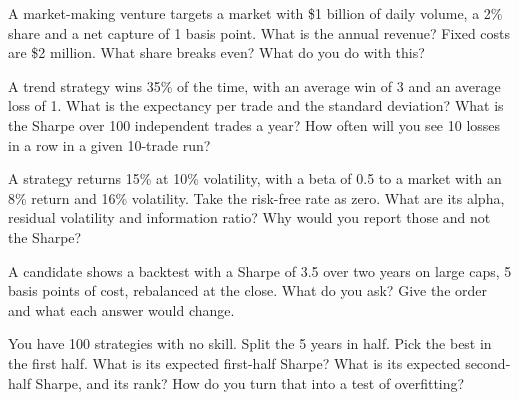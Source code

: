 \begin{question}\label{iq:iv2:research-and-strategy-cases:23}
A market-making venture targets a market with \$1 billion of daily volume, a 2\% share and a net capture of 1 basis point. What is the annual revenue? Fixed costs are \$2 million. What share breaks even? What do you do with this?
\end{question}

\begin{question}\label{iq:iv2:research-and-strategy-cases:24}
A trend strategy wins 35\% of the time, with an average win of 3 and an average loss of 1. What is the expectancy per trade and the standard deviation? What is the Sharpe over 100 independent trades a year? How often will you see 10 losses in a row in a given 10-trade run?
\end{question}

\begin{question}\label{iq:iv2:research-and-strategy-cases:25}
A strategy returns 15\% at 10\% volatility, with a beta of 0.5 to a market with an 8\% return and 16\% volatility. Take the risk-free rate as zero. What are its alpha, residual volatility and information ratio? Why would you report those and not the Sharpe?
\end{question}

\begin{question}\label{iq:iv2:research-and-strategy-cases:26}
A candidate shows a backtest with a Sharpe of 3.5 over two years on large caps, 5 basis points of cost, rebalanced at the close. What do you ask? Give the order and what each answer would change.
\end{question}

\begin{question}\label{iq:iv2:research-and-strategy-cases:27}
You have 100 strategies with no skill. Split the 5 years in half. Pick the best in the first half. What is its expected first-half Sharpe? What is its expected second-half Sharpe, and its rank? How do you turn that into a test of overfitting?
\end{question}

